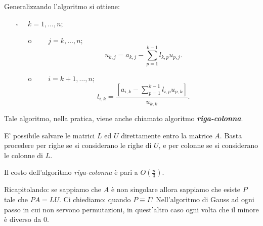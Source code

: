 Generalizzando l'algoritmo si ottiene:

\begin{itemize}
\item[$\square$] $\quad k = 1, \ldots, n;$
    \begin{itemize}
    \item[o] $\qquad j = k, \ldots, n;$
      \[u_{k,j} = a_{k,j} - \sum_{p=1}^{k-1}l_{k,p}u_{p,j}.
      \]
    \item[o] $\qquad i = k+1, \ldots, n;$\\
      \[ l_{i,k} = \frac{\left[ a_{i,k} - \sum_{p = 1}^{k-1}l_{i,p}u_{p,k}\right]}
         {u_{k,k}}.\]
    \end{itemize}
\end{itemize}

Tale algoritmo, nella pratica, viene anche chiamato algoritmo \textbf{\emph{riga-colonna}}.

\begin{osse}
E' possibile salvare le matrici $L$ ed $U$ direttamente entro la matrice $A$. Basta procedere
per righe se si considerano le righe di $U$, e per colonne se si considerano le colonne di $L$.
\end{osse}

\begin{osse}
Il costo dell'algoritmo \emph{riga-colonna} è pari a $O(\frac{n}{3})$.
\end{osse}

Ricapitolando: se sappiamo che $A$ è non singolare allora sappiamo che esiste $P$ tale che
$PA = LU$. Ci chiediamo: quando $P \equiv I$? Nell'algoritmo di Gauss ad ogni passo in cui
non servono permutazioni, in quest'altro caso ogni volta che il minore è diverso da $0$.

